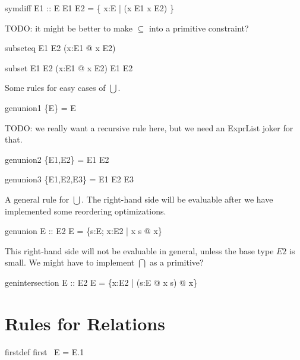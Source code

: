 \documentclass{article}
\begin{document}
\begin{zedrule}{symdiff}
  E1 :: \power E
\derives
   E1 \symdiff E2 = \{ x:E | \lnot (x \in E1 \iff x \in E2) \}
\end{zedrule}

TODO: it might be better to make $\subseteq$ into a primitive constraint?
\begin{zedrule}{subseteq}
   E1 \subseteq E2 \iff (\forall x:E1 @ x \in E2)
\end{zedrule}

\begin{zedrule}{subset}
   E1 \subset E2 \iff (\forall x:E1 @ x \in E2) \land E1 \neq E2
\end{zedrule}

Some rules for easy cases of $\bigcup$.
\begin{zedrule}{genunion1}
   \bigcup \{E\} = E
\end{zedrule}

TODO: we really want a recursive rule here,
but we need an ExprList joker for that.
\begin{zedrule}{genunion2}
   \bigcup \{E1,E2\} = E1 \cup E2
\end{zedrule}
\begin{zedrule}{genunion3}
   \bigcup \{E1,E2,E3\} = E1 \cup E2 \cup E3
\end{zedrule}

A general rule for $\bigcup$.
The right-hand side will be evaluable after we have implemented
some reordering optimizations. 
\begin{zedrule}{genunion}
   E :: \power \power E2
\derives
   \bigcup E = \{s:E; x:E2 | x \in s @ x\}
\end{zedrule}

This right-hand side will not be evaluable in general,
unless the base type $E2$ is small.  We might have to
implement $\bigcap$ as a primitive?
\begin{zedrule}{genintersection}
   E :: \power \power E2
\derives
   \bigcap E = \{x:E2 | (\forall s:E @ x \in s) @ x\}
\end{zedrule}


\section{Rules for Relations}

\begin{zedrule}{firstdef}
   first~ E = E.1
\end{zedrule}
\end{document}
